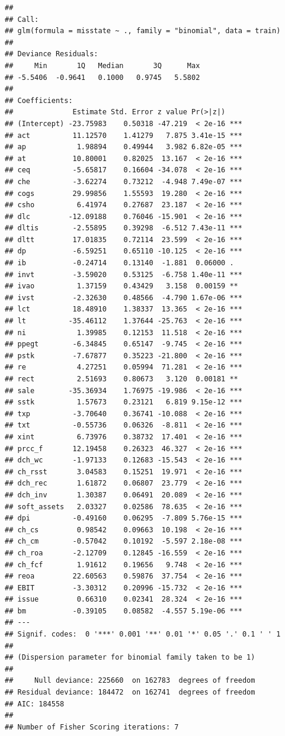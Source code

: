 \documentclass[a4paper, nobind]{templates/ociamthesis}
\begin{document}
\begin{verbatim}
## 
## Call:
## glm(formula = misstate ~ ., family = "binomial", data = train)
## 
## Deviance Residuals: 
##     Min       1Q   Median       3Q      Max  
## -5.5406  -0.9641   0.1000   0.9745   5.5802  
## 
## Coefficients:
##              Estimate Std. Error z value Pr(>|z|)    
## (Intercept) -23.75983    0.50318 -47.219  < 2e-16 ***
## act          11.12570    1.41279   7.875 3.41e-15 ***
## ap            1.98894    0.49944   3.982 6.82e-05 ***
## at           10.80001    0.82025  13.167  < 2e-16 ***
## ceq          -5.65817    0.16604 -34.078  < 2e-16 ***
## che          -3.62274    0.73212  -4.948 7.49e-07 ***
## cogs         29.99856    1.55593  19.280  < 2e-16 ***
## csho          6.41974    0.27687  23.187  < 2e-16 ***
## dlc         -12.09188    0.76046 -15.901  < 2e-16 ***
## dltis        -2.55895    0.39298  -6.512 7.43e-11 ***
## dltt         17.01835    0.72114  23.599  < 2e-16 ***
## dp           -6.59251    0.65110 -10.125  < 2e-16 ***
## ib           -0.24714    0.13140  -1.881  0.06000 .  
## invt         -3.59020    0.53125  -6.758 1.40e-11 ***
## ivao          1.37159    0.43429   3.158  0.00159 ** 
## ivst         -2.32630    0.48566  -4.790 1.67e-06 ***
## lct          18.48910    1.38337  13.365  < 2e-16 ***
## lt          -35.46112    1.37644 -25.763  < 2e-16 ***
## ni            1.39985    0.12153  11.518  < 2e-16 ***
## ppegt        -6.34845    0.65147  -9.745  < 2e-16 ***
## pstk         -7.67877    0.35223 -21.800  < 2e-16 ***
## re            4.27251    0.05994  71.281  < 2e-16 ***
## rect          2.51693    0.80673   3.120  0.00181 ** 
## sale        -35.36934    1.76975 -19.986  < 2e-16 ***
## sstk          1.57673    0.23121   6.819 9.15e-12 ***
## txp          -3.70640    0.36741 -10.088  < 2e-16 ***
## txt          -0.55736    0.06326  -8.811  < 2e-16 ***
## xint          6.73976    0.38732  17.401  < 2e-16 ***
## prcc_f       12.19458    0.26323  46.327  < 2e-16 ***
## dch_wc       -1.97133    0.12683 -15.543  < 2e-16 ***
## ch_rsst       3.04583    0.15251  19.971  < 2e-16 ***
## dch_rec       1.61872    0.06807  23.779  < 2e-16 ***
## dch_inv       1.30387    0.06491  20.089  < 2e-16 ***
## soft_assets   2.03327    0.02586  78.635  < 2e-16 ***
## dpi          -0.49160    0.06295  -7.809 5.76e-15 ***
## ch_cs         0.98542    0.09663  10.198  < 2e-16 ***
## ch_cm        -0.57042    0.10192  -5.597 2.18e-08 ***
## ch_roa       -2.12709    0.12845 -16.559  < 2e-16 ***
## ch_fcf        1.91612    0.19656   9.748  < 2e-16 ***
## reoa         22.60563    0.59876  37.754  < 2e-16 ***
## EBIT         -3.30312    0.20996 -15.732  < 2e-16 ***
## issue         0.66310    0.02341  28.324  < 2e-16 ***
## bm           -0.39105    0.08582  -4.557 5.19e-06 ***
## ---
## Signif. codes:  0 '***' 0.001 '**' 0.01 '*' 0.05 '.' 0.1 ' ' 1
## 
## (Dispersion parameter for binomial family taken to be 1)
## 
##     Null deviance: 225660  on 162783  degrees of freedom
## Residual deviance: 184472  on 162741  degrees of freedom
## AIC: 184558
## 
## Number of Fisher Scoring iterations: 7
\end{verbatim}
\end{document}
